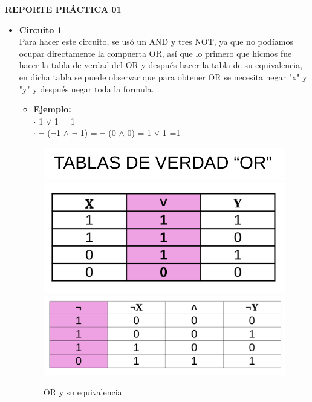 \documentclass[11pt,letterpaper]{article}
\begin{document}
\textbf{REPORTE PRÁCTICA 01}
\begin{itemize}
	
	\item \textbf{Circuito 1}\\
	Para hacer este circuito, se usó un AND y tres NOT, ya que no podíamos ocupar directamente la compuerta OR, así que lo primero que hicmos fue hacer la tabla de verdad del OR y después hacer la tabla de su equivalencia, en dicha tabla se puede observar que para obtener OR se necesita negar "x" y "y" y después negar toda la formula.
	\begin{itemize}
		\item \textbf{Ejemplo:}\\
		$\cdot$ 1 $\lor$ 1 = 1 \\
		$\cdot$ $\neg$ ($\neg$1 $\land$ $\neg$ 1) = $\neg$ (0 $\land$ 0) = 1 $\lor$ 1 =1		
	\end{itemize}
		
		\begin{figure}[h]
			\centering
			\includegraphics[scale=0.15]{TOR.png}\\
			\includegraphics[scale=0.15]{OR.png}
			\includegraphics[scale=0.15]{EquivalenciaOR.png}
			\caption{OR y su equivalencia}
		\end{figure}
	

\end{itemize}
\end{document}
